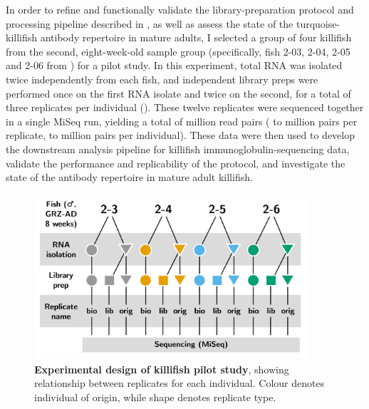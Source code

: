 In order to refine and functionally validate the library-preparation protocol and processing pipeline described in , as well as assess the state of the turquoise-killifish antibody repertoire in mature adults, I selected a group of four killifish from the second, eight-week-old sample group (specifically, fish 2-03, 2-04, 2-05 and 2-06 from ) for a pilot study. In this experiment, total RNA was isolated twice independently from each fish, and independent library preps were performed once on the first RNA isolate and twice on the second, for a total of three replicates per individual (). These twelve replicates were sequenced together in a single MiSeq run, yielding a total of  million read pairs ( to  million pairs per replicate,  to  million pairs per individual). These data were then used to develop the downstream analysis pipeline for killifish immunoglobulin-sequencing data, validate the performance and replicability of the protocol, and investigate the state of the antibody repertoire in mature adult killifish.

\begin{figure}
\centering
\includegraphics[width = 0.9\textwidth]{_Figures/png_edited/igseq-pilot-design_wide.png}
\caption[Experimental design of killifish \igseq pilot study]{\textbf{Experimental design of killifish \igseq pilot study}, showing relationship between replicates for each individual. Colour denotes individual of origin, while shape denotes replicate type.}
\label{fig:igseq-pilot-design}
\end{figure}

